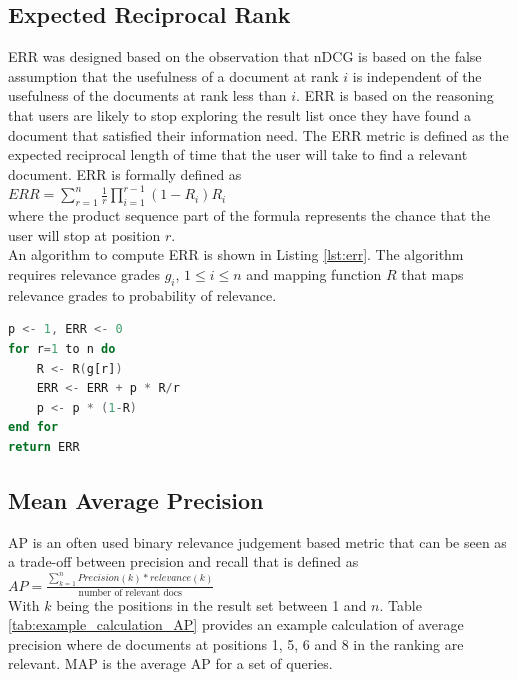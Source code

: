 \subsection{Expected Reciprocal Rank}
\ac{ERR} \cite{Chapelle2009} was designed based on the observation that \ac{nDCG} is based on the false assumption that the usefulness of a document at rank $i$ is independent of the usefulness of the documents at rank less than $i$. \ac{ERR} is based on the reasoning that users are likely to stop exploring the result list once they have found a document that satisfied their information need. The \ac{ERR} metric is defined as the expected reciprocal length of time that the user will take to find a relevant document. \ac{ERR} is formally defined as\\

$ERR = \sum\nolimits_{r=1}^n \frac{1}{r} \prod\nolimits_{i=1}^{r-1}(1-R_i)R_i$\\

where the product sequence part of the formula represents the chance that the user will stop at position $r$.\\
An algorithm to compute \ac{ERR} is shown in Listing \ref{lst:err}. The algorithm requires relevance grades $g_i$, $1 \le i \le n$ and mapping function $R$ that maps relevance grades to probability of relevance.
\begin{lstlisting}[caption={Algorithm to compute the ERR metric, obtained from \cite{Chapelle2009}}, label={lst:err},language=Ada]
p <- 1, ERR <- 0
for r=1 to n do
	R <- R(g[r])
	ERR <- ERR + p * R/r
	p <- p * (1-R)
end for
return ERR
\end{lstlisting}
\subsection{Mean Average Precision}
\ac{AP} \cite{Zhu2004} is an often used binary relevance judgement based metric that can be seen as a trade-off between precision and recall that is defined as\\

$AP = \frac{\sum\nolimits_{k=1}^{n}Precision(k)*relevance(k)}{\text{number of relevant docs}}$\\

With $k$ being the positions in the result set between 1 and $n$. Table \ref{tab:example_calculation_AP} provides an example calculation of average precision where de documents at positions 1, 5, 6 and 8 in the ranking are relevant.
\ac{MAP} is the average \ac{AP} for a set of queries.\\

